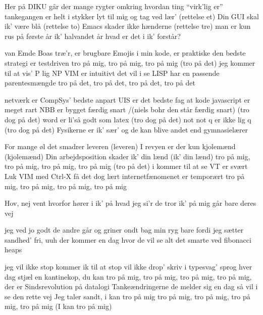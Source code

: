 \documentclass[a4paper,11pt]{article}
\begin{document}
\begin{song}
 Her på DIKU går der mange rygter
omkring hvordan ting “virk’lig er”
tankegangen er helt i stykker
lyt til mig og tag ved lær’
 (rettelse et)
 Din GUI skal ik’ være blå
 (rettelse to)
 Emacs skader ikke hænderne
 (rettelse tre)
 man er kun rus på første år
ik’ halvandet år
hvad er det i ik’ forstår?

 van Emde Boas træ’r, er brugbare
Emojis i min kode, er praktiske 
den bedste strategi 
er testdriven
tro på mig, tro på mig, tro på mig
(tro på det)
 jeg kommer til at vis’
P lig NP
VIM er intuitivt
det vil i se
LISP har en passende parentesmængde
tro på det, tro på det, tro på det, tro på det

 netværk er CompSys’ bedste anpart
UIS er det bedste fag
at kode javascript er meget rart
NBB er bygget færdig snart /(niels bohr den står færdig snart)
 (tro dog på det)
 word er li’så godt som latex
 (tro dog på det)
 not not q er ikke lig q
 (tro dog på det)
 Fysikerne er ik’ sær’
og de kan blive andet end gymnasielærer

 For mange øl det smadrer leveren
(leveren)
I revyen er der kun kjolemænd
(kjolemænd)
Din arbejdsposition 
skader ik’ din lænd
 (ik' din lænd)
 tro på mig, tro på mig, tro på mig, tro på mig
(tro på det)
i kommer til at se
VT er svært
Luk VIM med Ctrl-X
få det dog lært
internetfænomenet er temporært
tro på mig, tro på mig, tro på mig, tro på mig

Hov, nej vent
hvorfor hører i ik’
på hvad jeg si’r
de tror ik’ på mig
går bare deres vej

 jeg ved jo godt
de andre går
og griner ondt bag
min ryg
bare fordi
jeg sætter sandhed’ fri, 
 uuh
 der kommer en dag 
hvor de vil se
alt det smarte ved
fibonacci heaps

 jeg vil ikke stop
kommer ik til at stop vil ikke drop’
 skriv i typesvag’
sprog hver dag
 stjæl en kantinekop, du kan
tro på mig, tro på mig, tro på mig, tro på mig, der er  
 Sindsrevolution på datalogi
Tankeændringerne
de melder sig
en dag så vil i se
den rette vej
Jeg taler sandt, i kan tro på mig
tro på mig, tro på mig,
tro på mig, tro på mig 
 (I kan tro på mig)


\end{song}
\end{document}
